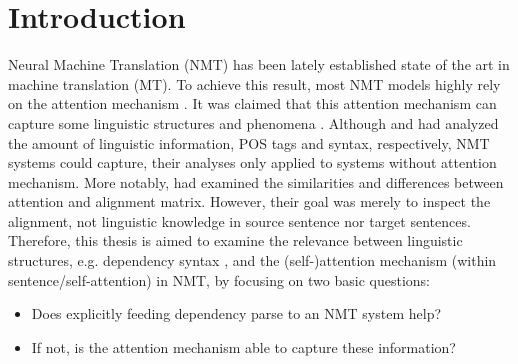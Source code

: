 \chapter*{Introduction}

Neural Machine Translation (NMT) has been lately established state of the art in machine translation (MT). To achieve this result, most NMT models highly rely on the attention mechanism \citep{bahdanau:etal:attention:iclr:2015}. It was claimed that this attention mechanism can capture some linguistic structures and phenomena \citep{DBLP:conf/nips/VaswaniSPUJGKP17}. Although \cite{DBLP:conf/acl/BelinkovDDSG17} and \cite{DBLP:conf/emnlp/ShiPK16} had analyzed the amount of linguistic information, POS tags and syntax, respectively, NMT systems could capture, their analyses only applied to systems without attention mechanism. More notably, \cite{DBLP:conf/ijcnlp/GhaderM17} had examined the similarities and differences between attention and alignment matrix. However, their goal was merely to inspect the alignment, not linguistic knowledge in source sentence nor target sentences. Therefore, this thesis is aimed to examine the relevance between linguistic structures, e.g. dependency syntax \citep{melvcuk1988dependency}, and the (self-)attention mechanism (within sentence/self-attention) in NMT, by focusing on two basic questions:
\begin{itemize}
	\item Does explicitly feeding dependency parse to an NMT system help?
    \item If not, is the attention mechanism able to capture these information?
\end{itemize}
